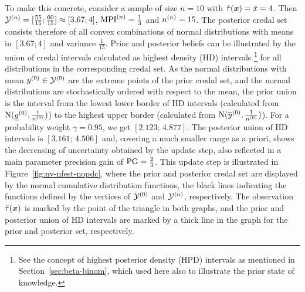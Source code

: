 \begin{example}
To make this concrete, consider a sample of size $n = 10$
with $\tilde{\tau}({\bm x}) = \bar{x} = 4$.
Then $\mathcal{Y}^{(n)} = [\frac{55}{15} ; \frac{60}{15}] \approx [3.67 ; 4]$,
${\rm MPI}^{(n)}=\frac{1}{3}$ and $n^{(n)} = 15$. The posterior credal set
consists therefore of all convex combinations of normal
distributions with means in $[3.67 ; 4]$ and variance
$\frac{1}{15}$.
%
%
Prior and posterior beliefs can be illustrated by the union of
credal intervals calculated as highest density (HD) intervals%
\footnote{See the concept of highest posterior density (HPD) intervals
as mentioned in Section~\ref{sec:beta-binom}, which used here also to
illustrate the prior state of knowledge.}
for all distributions in the corresponding credal set.
As the normal distributions with mean $y^{(0)} \in \mathcal{Y}^{(0)}$ are the extreme points of the prior credal set,
and the normal distributions are stochastically ordered with respect to the mean,
the prior union is the interval from the lowest lower border of HD intervals
(calculated from $\operatorname{N}(\underline{y}^{(0)}, \frac{1}{n^{(0)}})$) to the highest upper border
(calculated from $\operatorname{N}(\overline{y}^{(0)}, \frac{1}{n^{(0)}})$).
For a probability weight $\gamma = 0.95$, we get $[2.123;\, 4.877]$.
%
%
The posterior union of HD intervals is
$[3.161;\, 4.506]$ and, covering a much smaller range as a priori, shows
the decreasing of uncertainty obtained by the update step, also
reflected in a main parameter precision gain of ${\rm PG}=\frac{2}{3}$.
This update step is illustrated in Figure~\ref{fig:nv-nfest-nopdc},
where the prior and posterior credal set are displayed by the normal
cumulative distribution functions, the black lines indicating the
functions defined by the vertices of $\mathcal{Y}^{(0)}$ and $\mathcal{Y}^{(n)}$, respectively. %
The observation $\tilde{\tau}({\bm x})$ is marked by the point of the triangle
in both graphs, and the prior and posterior union of HD intervals are marked
by a thick line in the graph for the prior and posterior set, respectively.
\end{example}

